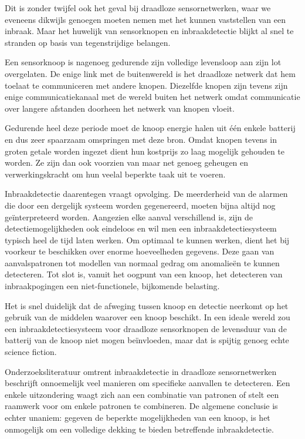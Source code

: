 \documentclass[DIV=calc,paper=a4,fontsize=11pt,twocolumn]{scrartcl}
\begin{document}
Dit is zonder twijfel ook het geval bij draadloze sensornetwerken, waar we
eveneens dikwijls genoegen moeten nemen met het kunnen vaststellen van een
inbraak. Maar het huwelijk van sensorknopen en inbraakdetectie blijkt al snel
te stranden op basis van tegenstrijdige belangen.

Een sensorknoop is nagenoeg gedurende zijn volledige levensloop aan zijn lot
overgelaten. De enige link met de buitenwereld is het draadloze netwerk dat hem
toelaat te communiceren met andere knopen. Diezelfde knopen zijn tevens zijn
enige communicatiekanaal met de wereld buiten het netwerk omdat communicatie
over langere afstanden doorheen het netwerk van knopen vloeit.

Gedurende heel deze periode moet de knoop energie halen uit \'e\'en enkele
batterij en dus zeer spaarzaam omspringen met deze bron. Omdat knopen tevens in
groten getale worden ingezet dient hun kostprijs zo laag mogelijk gehouden te
worden. Ze zijn dan ook voorzien van maar net genoeg geheugen en
verwerkingskracht om hun veelal beperkte taak uit te voeren.

Inbraakdetectie daarentegen vraagt opvolging. De meerderheid van de alarmen die
door een dergelijk systeem worden gegenereerd, moeten bijna altijd nog
ge\"interpreteerd worden. Aangezien elke aanval verschillend is, zijn de
detectiemogelijkheden ook eindeloos en wil men een inbraakdetectiesysteem
typisch heel de tijd laten werken. Om optimaal te kunnen werken, dient het bij
voorkeur te beschikken over enorme hoeveelheden gegevens. Deze gaan van
aanvalspatronen tot modellen van normaal gedrag om anomalie\"en te kunnen
detecteren. Tot slot is, vanuit het oogpunt van een knoop, het detecteren van
inbraakpogingen een niet-functionele, bijkomende belasting.

Het is snel duidelijk dat de afweging tussen knoop en detectie neerkomt op het
gebruik van de middelen waarover een knoop beschikt. In een ideale wereld zou
een inbraakdetectiesysteem voor draadloze sensorknopen de levensduur van de
batterij van de knoop niet mogen be\"invloeden, maar dat is spijtig genoeg
echte science fiction.

Onderzoeksliteratuur omtrent inbraakdetectie in draadloze sensornetwerken
beschrijft onnoemelijk veel manieren om specifieke aanvallen te detecteren. Een
enkele uitzondering waagt zich aan een combinatie van patronen of stelt een
raamwerk voor om enkele patronen te combineren. De algemene conclusie is echter
unaniem: gegeven de beperkte mogelijkheden van een knoop, is het onmogelijk om
een volledige dekking te bieden betreffende inbraakdetectie.
\end{document}
